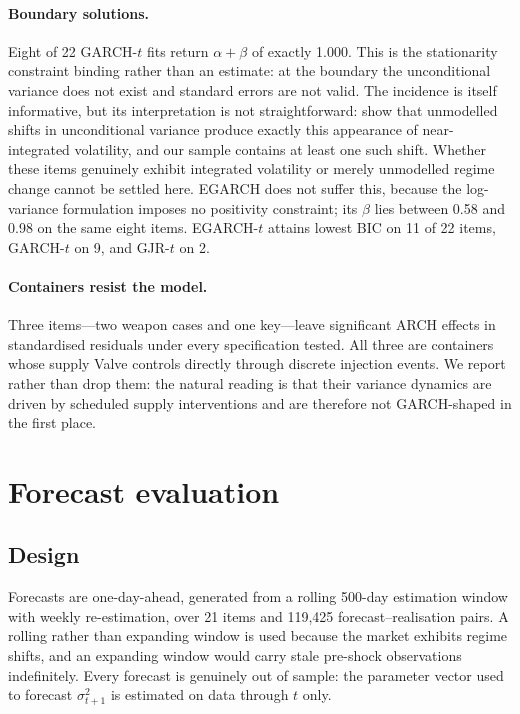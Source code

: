 \documentclass[11pt,a4paper]{article}
\begin{document}
\paragraph{Boundary solutions.}
Eight of 22 GARCH-$t$ fits return $\alpha+\beta$ of exactly 1.000. This is the
stationarity constraint binding rather than an estimate: at the boundary the
unconditional variance does not exist and standard errors are not valid. The
incidence is itself informative, but its interpretation is not straightforward:
\citet{LamoureuxLastrapes1990} show that unmodelled shifts in unconditional
variance produce exactly this appearance of near-integrated volatility, and our
sample contains at least one such shift. Whether these items genuinely exhibit
integrated volatility or merely unmodelled regime change cannot be settled
here. EGARCH does not suffer this, because
the log-variance formulation imposes no positivity constraint; its $\beta$ lies
between 0.58 and 0.98 on the same eight items. EGARCH-$t$ attains lowest BIC on
11 of 22 items, GARCH-$t$ on 9, and GJR-$t$ on 2.

\paragraph{Containers resist the model.}
Three items---two weapon cases and one key---leave significant ARCH effects in
standardised residuals under every specification tested. All three are
containers whose supply Valve controls directly through discrete injection
events. We report rather than drop them: the natural reading is that their
variance dynamics are driven by scheduled supply interventions and are
therefore not GARCH-shaped in the first place.

\section{Forecast evaluation}\label{sec:forecast}

\subsection{Design}

Forecasts are one-day-ahead, generated from a rolling 500-day estimation window
with weekly re-estimation, over 21 items and 119{,}425 forecast--realisation
pairs. A rolling rather than expanding window is used because the market
exhibits regime shifts, and an expanding window would carry stale pre-shock
observations indefinitely. Every forecast is genuinely out of sample: the
parameter vector used to forecast $\sigma_{t+1}^2$ is estimated on data through
$t$ only.
\end{document}
